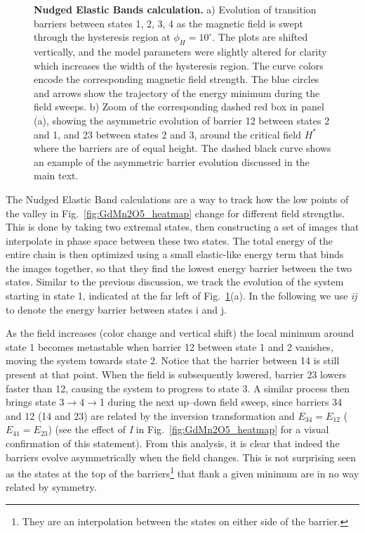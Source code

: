 \begin{figure}[h]
    \caption{\label{fig:GdMn2O5_neb}{\bf Nudged Elastic Bands calculation.}
    a) Evolution of transition barriers between states 1, 2, 3, 4 as the magnetic field is swept through the hysteresis region at $\phi_H = 10^\circ$. The plots are shifted vertically, and the model parameters were slightly altered for clarity which increases the width of the hysteresis region. The curve colors encode the corresponding magnetic field strength. The blue circles and arrows show the trajectory of the energy minimum during the field sweeps.
    b) Zoom of the corresponding dashed red box in panel (a), showing the asymmetric evolution of barrier 12 between states 2 and 1, and 23 between states 2 and 3, around the critical field $H^\ast$ where the barriers are of equal height. The dashed black curve shows an example of the asymmetric barrier evolution discussed in the main text.
    }
\end{figure}
%
The Nudged Elastic Band calculations are a way to track how the low points of the valley in Fig.~\ref{fig:GdMn2O5_heatmap} change for different field strengths.
This is done by taking two extremal states, then constructing a set of images that interpolate in phase space between these two states. The total energy of the entire chain is then optimized using a small elastic-like energy term that binds the images together, so that they find the lowest energy barrier between the two states.  
Similar to the previous discussion, we track the evolution of the system starting in state 1, indicated at the far left of Fig.~\ref{fig:GdMn2O5_neb}(a).
In the following we use {\it ij} to denote the energy barrier between states i and j.

As the field increases (color change and vertical shift) the local minimum around state 1 becomes metastable when barrier 12 between state 1 and 2 vanishes, moving the system towards state 2.
Notice that the barrier between 14 is still present at that point.
When the field is subsequently lowered, barrier 23 lowers faster than 12, causing the system to progress to state 3.
A similar process then brings state 3$\rightarrow$4$\rightarrow$1 during the next up--down field sweep, since barriers 34 and 12  (14 and 23) are related by the inversion transformation and  $E_{34} = E_{12}$ ($E_{41} = E_{23}$) (see the effect of {\it I} in Fig.~\ref{fig:GdMn2O5_heatmap} for a visual confirmation of this statement).
From this analysis, it is clear that indeed the barriers evolve asymmetrically when the field changes.
This is not surprising seen as the states at the top of the barriers\footnote{They are an interpolation between the states on either side of the barrier.} that flank a given minimum are in no way related by symmetry.

